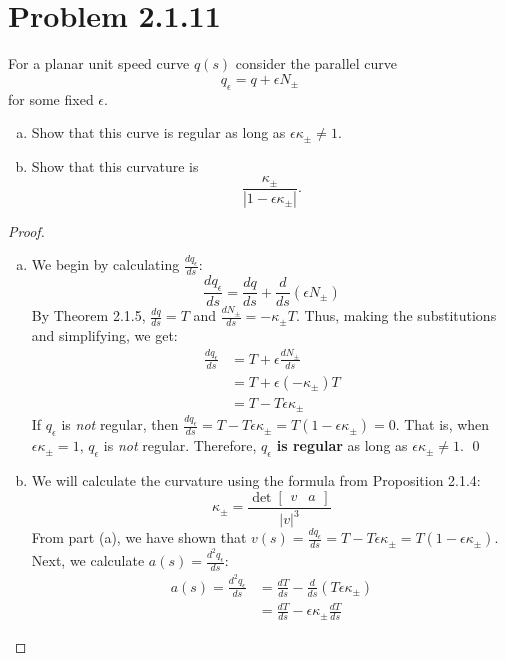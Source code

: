 \documentclass[12pt]{article}
\newcommand\abs[1]{\left| #1 \right|}
\newcommand\parens[1]{\left( #1 \right)}
\newcommand\solproof[1]{\begin{mdframed}
\begin{proof} #1
\end{proof}
\end{mdframed}}
\begin{document}
\section*{Problem 2.1.11}
For a planar unit speed curve $q(s)$ consider the parallel curve
\[q_\epsilon = q + \epsilon N_\pm\] 
for some fixed $\epsilon$.
\begin{enumerate}[(a)]
    \item Show that this curve is regular as long as $\epsilon\kappa_\pm \neq 1$.
    \item Show that this curvature is \[\frac{\kappa_\pm}{\abs{1 - \epsilon\kappa_\pm}}.\]
\end{enumerate}

\solproof{
    \begin{enumerate}[(a)]
        \item We begin by calculating $\frac{dq_\epsilon}{ds}$:
        \[\frac{dq_\epsilon}{ds} = \frac{dq}{ds} + \frac{d}{ds}\parens{\epsilon N_\pm}\]
        By Theorem 2.1.5, $\frac{dq}{ds} = T$ and $\frac{dN_\pm}{ds} = -\kappa_\pm T$. Thus, making the substitutions and simplifying, we get:
        \begin{align*}
            \frac{dq_\epsilon}{ds} &= T + \epsilon \frac{dN_\pm}{ds} \\
            &= T + \epsilon\parens{-\kappa_\pm}T \\
            &= T - T\epsilon\kappa_\pm
        \end{align*}
        If $q_\epsilon$ is \emph{not} regular, then $\frac{dq_\epsilon}{ds} = T - T\epsilon\kappa_\pm = T\parens{1 - \epsilon\kappa_\pm} = 0$. That is, when $\epsilon\kappa_\pm = 1$, $q_\epsilon$ is \emph{not} regular. Therefore, $q_\epsilon$ \textbf{is regular} as long as $\epsilon\kappa_\pm \neq 1$. \hfill \qed
        \item We will calculate the curvature using the formula from Proposition 2.1.4:
        \[\kappa_\pm = \frac{\det \begin{bmatrix} v & a \end{bmatrix}}{\abs{v}^3}\]
        From part (a), we have shown that $v(s) = \frac{dq_\epsilon}{ds} = T - T\epsilon\kappa_\pm = T\parens{1 - \epsilon\kappa_\pm}$. Next, we calculate $a(s) = \frac{d^2q_\epsilon}{ds}$:
        \begin{align*}
            a(s) = \frac{d^2q_\epsilon}{ds} &= \frac{dT}{ds} - \frac{d}{ds}\parens{T\epsilon\kappa_\pm} \\
            &= \frac{dT}{ds} - \epsilon\kappa_\pm \frac{dT}{ds}
        \end{align*}

\end{enumerate}}
\end{document}
